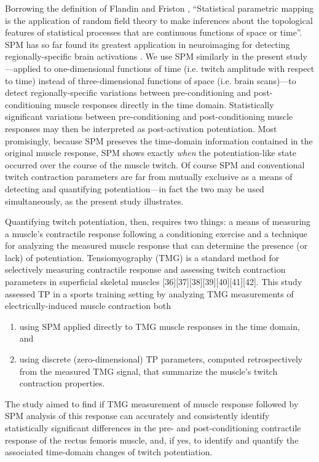 \documentclass[utf8]{style/FrontiersinHarvard}
\begin{document}
Borrowing the definition of Flandin and Friston \cite{flandin}, 
``Statistical parametric mapping is the application of random field theory to make inferences about the topological features of statistical processes that are continuous functions of space or time''.
SPM has so far found its greatest application in neuroimaging for detecting regionally-specific brain activations \cite{friston}.
We use SPM similarly in the present study---applied to one-dimensional functions of time (i.e. twitch amplitude with respect to time) instead of three-dimensional functions of space (i.e. brain scans)---to detect regionally-specific variations between pre-conditioning and post-conditioning muscle responses directly in the time domain.
Statistically significant variations between pre-conditioning and post-conditioning muscle responses may then be interpreted as post-activation potentiation.
Most promisingly, because SPM preseves the time-domain information contained in the original muscle response, SPM shows exactly \textit{when} the potentiation-like state occurred over the course of the muscle twitch.
Of course SPM and conventional twitch contraction parameters are far from mutually exclusive as a means of detecting and quantifying potentiation---in fact the two may be used simultaneously, as the present study illustrates.

Quantifying twitch potentiation, then, requires two things: a means of measuring a muscle's contractile response following a conditioning exercise and a technique for analyzing the measured muscle response that can determine the presence (or lack) of potentiation.
Tensiomyography (TMG) is a standard method for selectively measuring contractile response and assessing twitch contraction parameters in superficial skeletal muscles [36][37][38][39][40][41][42].
This study assessed TP in a sports training setting by analyzing TMG measurements of electrically-induced muscle contraction both
\begin{enumerate}

    \item using SPM applied directly to TMG muscle responses in the time domain, and

    \item using discrete (zero-dimensional) TP parameters, computed retrospectively from the measured TMG signal, that summarize the muscle's twitch contraction properties.

\end{enumerate}
The study aimed to find if TMG measurement of muscle response followed by SPM analysis of this response can accurately and consistently identify statistically significant differences in the pre- and post-conditioning contractile response of the rectus femoris muscle, and,
if yes, to identify and quantify the associated time-domain changes of twitch potentiation.
\end{document}
